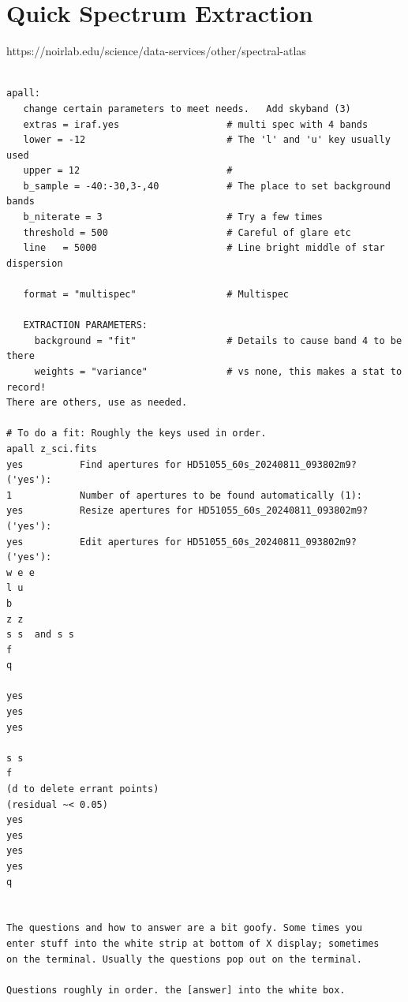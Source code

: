 \renewcommand{\footerfilename}{QuickSpectro.tex}

\section{Quick Spectrum Extraction}
https://noirlab.edu/science/data-services/other/spectral-atlas
\begingroup \fontsize{10pt}{10pt}
\selectfont
\begin{verbatim} 

apall:
   change certain parameters to meet needs.   Add skyband (3)
   extras = iraf.yes                   # multi spec with 4 bands
   lower = -12                         # The 'l' and 'u' key usually used
   upper = 12                          #
   b_sample = -40:-30,3-,40            # The place to set background bands
   b_niterate = 3                      # Try a few times
   threshold = 500                     # Careful of glare etc
   line   = 5000                       # Line bright middle of star dispersion
   
   format = "multispec"                # Multispec
   
   EXTRACTION PARAMETERS:
     background = "fit"                # Details to cause band 4 to be there
     weights = "variance"              # vs none, this makes a stat to record!
There are others, use as needed.

# To do a fit: Roughly the keys used in order.
apall z_sci.fits
yes          Find apertures for HD51055_60s_20240811_093802m9? ('yes'):    
1            Number of apertures to be found automatically (1):            
yes          Resize apertures for HD51055_60s_20240811_093802m9? ('yes'):  
yes          Edit apertures for HD51055_60s_20240811_093802m9? ('yes'):    
w e e
l u
b
z z
s s  and s s
f
q

yes
yes
yes

s s
f
(d to delete errant points)
(residual ~< 0.05)
yes
yes
yes
yes
q


The questions and how to answer are a bit goofy. Some times you
enter stuff into the white strip at bottom of X display; sometimes
on the terminal. Usually the questions pop out on the terminal.

Questions roughly in order. the [answer] into the white box.


\end{verbatim}
